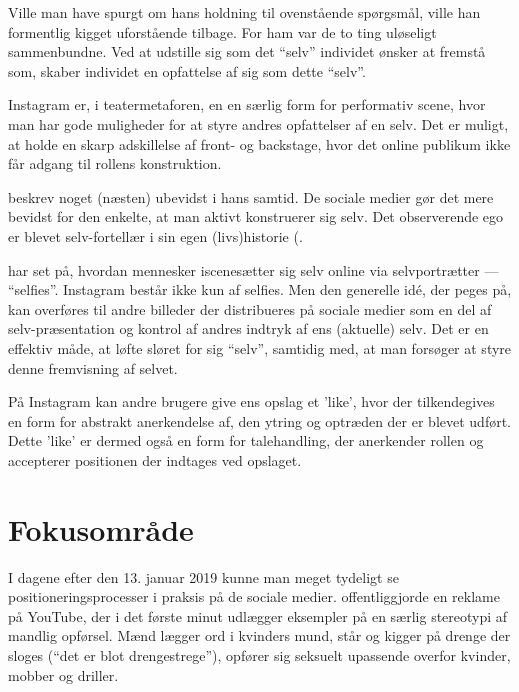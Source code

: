 Ville man have spurgt 
\citeauthor{goffmanPresentationSelfEveryday1956} om hans holdning 
til ovenstående spørgsmål, ville han formentlig kigget uforstående 
tilbage. For ham var de to ting uløseligt sammenbundne. Ved at 
udstille sig som det “selv” individet ønsker at fremstå som, 
skaber individet en opfattelse af sig som dette “selv”.

Instagram er, i teatermetaforen, en en særlig form for performativ 
scene, hvor man har gode muligheder for at styre andres 
opfattelser af en selv. Det er muligt, at holde en skarp 
adskillelse af front- og backstage, hvor det online publikum ikke 
får adgang til rollens konstruktion.

\citeauthor{goffmanPresentationSelfEveryday1956} beskrev noget 
(næsten) ubevidst i hans samtid. De sociale medier gør det mere 
bevidst for den enkelte, at man aktivt konstruerer sig selv.
Det observerende ego er blevet selv-fortellær i sin egen 
(livs)historie (\autocite{sulerSelfPortraitsSelfies2015}.

\citeauthor{sulerSelfPortraitsSelfies2015} har set på, hvordan 
mennesker iscenesætter sig selv online via selvportrætter — 
“selfies”. Instagram består ikke kun af selfies. Men den 
generelle idé, der peges på, kan overføres til andre billeder der 
distribueres på sociale medier som en del af selv-præsentation og
kontrol af andres indtryk af ens (aktuelle) selv. Det er en
effektiv måde, at løfte sløret for sig “selv”, samtidig med, at
man forsøger at styre denne fremvisning af selvet.

På Instagram kan andre brugere give ens opslag et 'like', hvor der 
tilkendegives en form for abstrakt anerkendelse af, den ytring og 
optræden der er blevet udført. Dette 'like' er dermed også en form 
for talehandling, der anerkender rollen og accepterer positionen 
der indtages ved opslaget.

\section{Fokusområde}

I dagene efter den 13. januar 2019 kunne man meget tydeligt se
positioneringsprocesser i praksis på de sociale medier.
\citeauthor{gilletteWeBelieveBest2019}  offentliggjorde en reklame
på YouTube, der i det første minut udlægger eksempler på en særlig
stereotypi af mandlig opførsel. Mænd lægger ord i kvinders mund,
står og kigger på drenge der sloges (“det er blot drengestrege”),
opfører sig seksuelt upassende overfor kvinder, mobber og driller.

